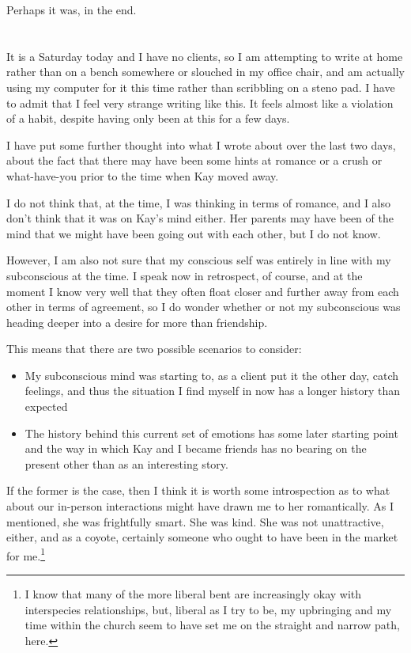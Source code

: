 Perhaps it was, in the end.

\section{}

It is a Saturday today and I have no clients, so I am attempting to write at home rather than on a bench somewhere or slouched in my office chair, and am actually using my computer for it this time rather than scribbling on a steno pad. I have to admit that I feel very strange writing like this. It feels almost like a violation of a habit, despite having only been at this for a few days.

I have put some further thought into what I wrote about over the last two days, about the fact that there may have been some hints at romance or a crush or what-have-you prior to the time when Kay moved away.

I do not think that, at the time, I was thinking in terms of romance, and I also don't think that it was on Kay's mind either. Her parents may have been of the mind that we might have been going out with each other, but I do not know.

However, I am also not sure that my conscious self was entirely in line with my subconscious at the time. I speak now in retrospect, of course, and at the moment I know very well that they often float closer and further away from each other in terms of agreement, so I do wonder whether or not my subconscious was heading deeper into a desire for more than friendship.

This means that there are two possible scenarios to consider:

\begin{itemize}
\tightlist
\item
  My subconscious mind was starting to, as a client put it the other day, catch feelings, and thus the situation I find myself in now has a longer history than expected
\item
  The history behind this current set of emotions has some later starting point and the way in which Kay and I became friends has no bearing on the present other than as an interesting story.
\end{itemize}

If the former is the case, then I think it is worth some introspection as to what about our in-person interactions might have drawn me to her romantically. As I mentioned, she was frightfully smart. She was kind. She was not unattractive, either, and as a coyote, certainly someone who ought to have been in the market for me.\footnote{I know that many of the more liberal bent are increasingly okay with interspecies relationships, but, liberal as I try to be, my upbringing and my time within the church seem to have set me on the straight and narrow path, here.}


